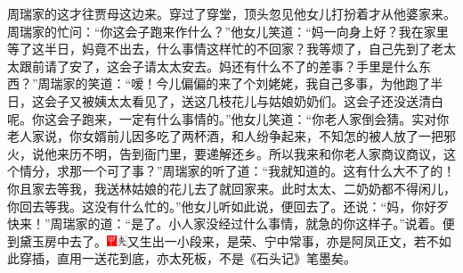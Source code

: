 周瑞家的这才往贾母这边来。穿过了穿堂，顶头忽见他女儿打扮着才从他婆家来。周瑞家的忙问：“你这会子跑来作什么？”他女儿笑道：“妈一向身上好？我在家里等了这半日，妈竟不出去，什么事情这样忙的不回家？我等烦了，自己先到了老太太跟前请了安了，这会子请太太安去。妈还有什么不了的差事？手里是什么东西？”周瑞家的笑道：“嗳！今儿偏偏的来了个刘姥姥，我自己多事，为他跑了半日，这会子又被姨太太看见了，送这几枝花儿与姑娘奶奶们。这会子还没送清白呢。你这会子跑来，一定有什么事情的。”他女儿笑道：“你老人家倒会猜。实对你老人家说，你女婿前儿因多吃了两杯酒，和人纷争起来，不知怎的被人放了一把邪火，说他来历不明，告到衙门里，要递解还乡。所以我来和你老人家商议商议，这个情分，求那一个可了事？”周瑞家的听了道：“我就知道的。这有什么大不了的！你且家去等我，我送林姑娘的花儿去了就回家来。此时太太、二奶奶都不得闲儿，你回去等我。这没有什么忙的。”他女儿听如此说，便回去了。还说：“妈，你好歹快来！”周瑞家的道：“是了。小人家没经过什么事情，就急的你这样子。”说着。便到黛玉房中去了。{\includegraphics[width=3mm]{../Images/00002}\includegraphics[width=3mm]{../Images/00012}\footnotesize \kaishu 又生出一小段来，是荣、宁中常事，亦是阿凤正文，若不如此穿插，直用一送花到底，亦太死板，不是《石头记》笔墨矣。}

